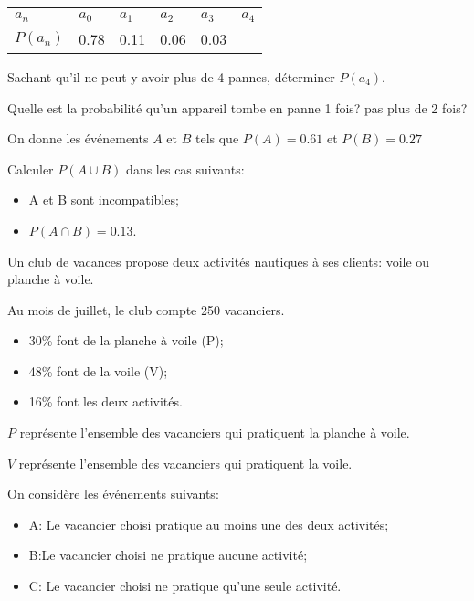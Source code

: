 \documentclass[a4paper,12pt]{scrartcl}
\begin{document}
\begin{center}
\begin{tabular}{|l|l|l|l|l|l|}
    \hline
    $a_n$    & $a_0$ & $a_1$ & $a_2$ & $a_3$ & $a_4$ \\ \hline
    $P(a_n)$ & 0.78  & 0.11  & 0.06  & 0.03  &       \\ \hline
\end{tabular}
\end{center}

\question{}
Sachant qu'il ne peut y avoir plus de 4 pannes, déterminer $P(a_4)$.

\question{}
Quelle est la probabilité qu'un appareil tombe en panne 1 fois? pas plus de 2 fois?

\exo[1]{}
On donne les événements $A$ et $B$ tels que $P(A) = 0.61$ et $P(B) = 0.27$

Calculer $P(A \cup B)$ dans les cas suivants: 

\begin{itemize}
    \item A et B sont incompatibles;
    \item $P(A \cap B) = 0.13$.
\end{itemize}


\exo[3]{}
Un club de vacances propose deux activités nautiques à ses clients: voile ou planche à voile.

Au mois de juillet, le club compte 250 vacanciers.
\begin{itemize}
    \item 30\% font de la planche à voile (P);
    \item 48\% font de la voile (V);
    \item 16\% font les deux activités.
\end{itemize}

$P$ représente l'ensemble des vacanciers qui pratiquent la planche à voile.

$V$ représente l'ensemble des vacanciers qui pratiquent la voile.

On considère les événements suivants: 

\begin{itemize}
    \item A: \og{}Le vacancier choisi pratique au moins une des deux activités\fg{};
    \item B:\og{}Le vacancier choisi ne pratique aucune activité\fg{};
    \item C: \og{}Le vacancier choisi ne pratique qu'une seule activité\fg{}.
\end{itemize}
\end{document}
